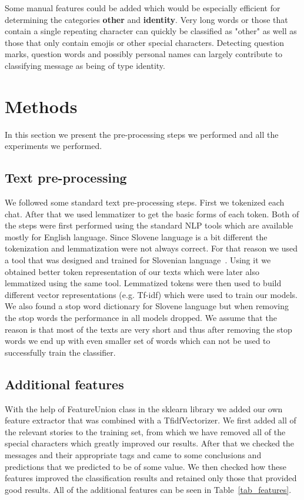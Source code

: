 \documentclass[11pt,a4paper]{article}
\begin{document}
Some manual features could be added which would be especially efficient for determining the categories \textbf{other} and \textbf{identity}.
Very long words or those that contain a single repeating character can quickly be classified as "other" as well as those that only contain emojis or other special characters.
Detecting question marks, question words and possibly personal names can largely contribute to classifying message as being of type identity.

\section{Methods}
In this section we present the pre-processing steps we performed and all the experiments we performed.

\subsection{Text pre-processing}
We followed some standard text pre-processing steps.
First we tokenized each chat.
After that we used lemmatizer to get the basic forms of each token.
Both of the steps were first performed using the standard NLP tools which are available mostly for English language.
Since Slovene language is a bit different the tokenization and lemmatization were not always correct.
For that reason we used a tool that was designed and trained for Slovenian language~\cite{slotokenizer}.
Using it we obtained better token representation of our texts which were later also lemmatized using the same tool.
Lemmatized tokens were then used to build different vector representations (e.g. Tf-idf) which were used to train our models.
We also found a stop word dictionary for Slovene language but when removing the stop words the performance in all models dropped.
We assume that the reason is that most of the texts are very short and thus after removing the stop words we end up with even smaller set of words which can not be used to successfully train the classifier.

\subsection{Additional features}

With the help of FeatureUnion class in the sklearn library we added our own feature extractor that was combined with a TfidfVectorizer.
We first added all of the relevant stories to the training set, from which we have removed all of the special characters which greatly improved our results.
After that we checked the messages and their appropriate tags and came to some conclusions and predictions that we predicted to be of some value.
We then checked how these features improved the classification results and retained only those that provided good results.
All of the additional features can be seen in Table~\ref{tab_features}.
\end{document}
